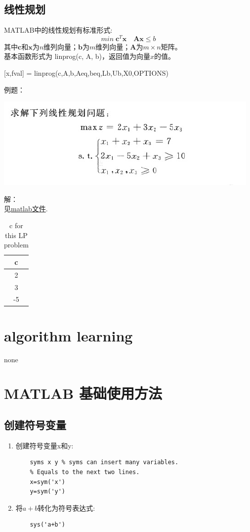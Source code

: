 \documentclass[12pt,a4paper]{article}
\begin{document}
\subsection{线性规划}
MATLAB中的线性规划有标准形式:
$$min\; \textbf{c}^T\textbf{x}\quad \textbf{Ax}\le b$$
其中$\textbf{c}$和$\textbf{x}$为$n$维列向量；$\textbf{b}$为$m$维列向量；$\textbf{A}$为$m\times n$矩阵。\\
基本函数形式为 linprog(c, A, b)，返回值为向量$x$的值。

[x,fval] = linprog(c,A,b,Aeq,beq,Lb,Ub,X0,OPTIONS)

例题：
\begin{center}
  \includegraphics[width=\textwidth]{figures/LP_example}
\end{center}
解：\\
见\href{run:matlab/simple_lp.m}{matlab文件}.
\begin{table}[!htbp]
  \caption{c for this LP problem}
  \centering
  \begin{tabular}{|c|}
    c\\
    \hline
    2\\
    \hline
    3\\
    \hline
    -5
  \end{tabular}
\end{table}




\section{algorithm learning}
none

\section{MATLAB 基础使用方法}
\subsection{创建符号变量}
\begin{enumerate}
  \item 创建符号变量x和y:
  \begin{lstlisting}
    syms x y % syms can insert many variables.
    % Equals to the next two lines.
    x=sym('x')
    y=sym('y')
  \end{lstlisting}
  \item 将$a+b$转化为符号表达式:
  \begin{lstlisting}
    sys('a+b')
  \end{lstlisting}
\end{enumerate}
\end{document}
